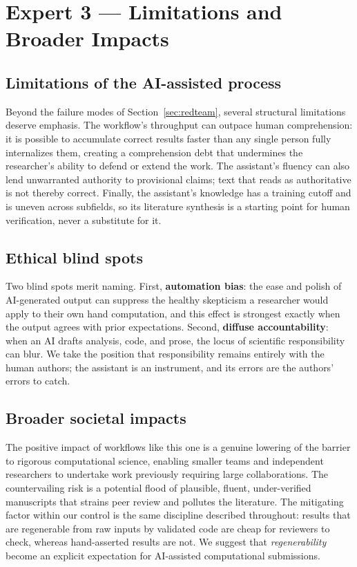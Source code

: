 \documentclass[11pt]{article}
\begin{document}
\section{Expert 3 --- Limitations and Broader Impacts}
\label{sec:limitations}

\subsection{Limitations of the AI-assisted process}

Beyond the failure modes of Section~\ref{sec:redteam}, several structural
limitations deserve emphasis. The workflow's throughput can outpace human
comprehension: it is possible to accumulate correct results faster than any single
person fully internalizes them, creating a comprehension debt that undermines the
researcher's ability to defend or extend the work. The assistant's fluency can also
lend unwarranted authority to provisional claims; text that reads as authoritative
is not thereby correct. Finally, the assistant's knowledge has a training cutoff and
is uneven across subfields, so its literature synthesis is a starting point for human
verification, never a substitute for it.

\subsection{Ethical blind spots}

Two blind spots merit naming. First, \textbf{automation bias}: the ease and polish
of AI-generated output can suppress the healthy skepticism a researcher would apply
to their own hand computation, and this effect is strongest exactly when the output
agrees with prior expectations. Second, \textbf{diffuse accountability}: when an AI
drafts analysis, code, and prose, the locus of scientific responsibility can blur.
We take the position that responsibility remains entirely with the human authors;
the assistant is an instrument, and its errors are the authors' errors to catch.

\subsection{Broader societal impacts}

The positive impact of workflows like this one is a genuine lowering of the barrier
to rigorous computational science, enabling smaller teams and independent
researchers to undertake work previously requiring large collaborations. The
countervailing risk is a potential flood of plausible, fluent, under-verified
manuscripts that strains peer review and pollutes the literature. The mitigating
factor within our control is the same discipline described throughout: results that
are regenerable from raw inputs by validated code are cheap for reviewers to check,
whereas hand-asserted results are not. We suggest that \emph{regenerability} become
an explicit expectation for AI-assisted computational submissions.
\end{document}
